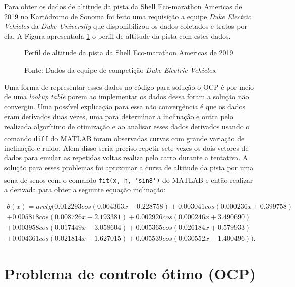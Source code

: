 Para obter os dados de altitude da pista da Shell Eco-marathon Americas de 2019 no Kartódromo de Sonoma foi feito uma requisição a equipe
\textit{Duke Electric Vehicles} da \textit{Duke University} que disponibilizou os dados coletados e tratos por ela. A Figura apresentada \ref{fig:altitude_pista} 
o perfil de altitude da pista com estes dados.

\begin{figure}[h]
    \centering
    \caption{Perfil de altitude da pista da Shell Eco-marathon Americas de 2019}
    
    \label{fig:altitude_pista}
    \caption*{\footnotesize{Fonte: Dados da equipe de competição \textit{Duke Electric Vehicles}.}}
\end{figure}

Uma forma de representar esses dados no código para solução o OCP é por meio de uma \textit{lookup table} porem ao implementar os dados dessa foram
a solução não convergiu. Uma possível explicação para essa não convergência é que os dados eram derivados duas vezes, uma para determinar a inclinação e outra pelo 
realizada algorítimo de otimização e ao analisar esses dados derivados usando o comando \lstinline[style=Matlab-editor]{diff} do MATLAB\textsuperscript{\textregistered} foram observadas curvas
com grande variação de inclinação e ruido. Alem disso seria preciso repetir sete vezes os dois vetores de dados para emular as repetidas voltas realiza pelo carro durante a tentativa.
A solução para esses problemas foi aproximar a curva de altitude da pista por uma sona de senos com o comando \lstinline[style=Matlab-editor]{fit(x, h, 'sin8')} do MATLAB\textsuperscript{\textregistered} 
e então realizar a derivada para obter a seguinte equação inclinação:

\begin{multline}
    \label{eq:modeloTheta}
        \theta(x) = arctg(0.012293 cos(0.004363 x - 0.228758) 
        +0.003041 cos(0.000236 x + 0.399758) \\
        +0.005818 cos(0.008726 x - 2.193381) 
        +0.002926 cos(0.000246 x + 3.490690) \\
        +0.003958 cos(0.017449 x - 3.058604) 
        +0.005365 cos(0.026184 x + 0.579933) \\
        +0.004361 cos(0.021814 x + 1.627015) 
        +0.005539 cos(0.030552 x - 1.400496)).
\end{multline}

\section{Problema de controle ótimo (OCP)}
\label{sec:OCPporposto}

